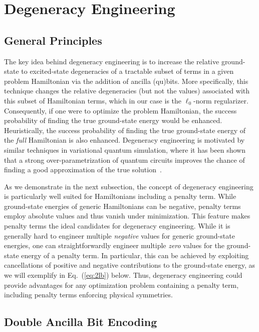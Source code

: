 \documentclass[aps,prd,twocolumn, superscriptaddress,preprintnumbers, nofootinbib,longbibliography,floatfix]{revtex4-2}
\DeclareRobustCommand{\Eq}[1]{Eq.~(\ref{#1})}
\begin{document}
\section{Degeneracy Engineering} \label{sec:DegEng}

\subsection{General Principles}

The key idea behind degeneracy engineering is to increase the relative ground-state to excited-state degeneracies of a tractable subset of terms in a given problem Hamiltonian via the addition of ancilla (qu)bits.
%
More specifically, this technique changes the relative degeneracies (but not the values) associated with this subset of Hamiltonian terms, which in our case is the $\ell_0$-norm regularizer.
%
Consequently, if one were to optimize the problem Hamiltonian, the success probability of finding the true ground-state energy would be enhanced.
%
Heuristically, the success probability of finding the true ground-state energy of the \emph{full} Hamiltonian is also enhanced.
%
Degeneracy engineering is motivated by similar techniques in variational quantum simulation, where it has been shown that a strong over-parametrization of quantum circuits improves the chance of finding a good approximation of the true solution~\cite{Fontana_2021,Kim_2021,anschuetz2022critical,anskiani}.


As we demonstrate in the next subsection, the concept of degeneracy engineering is particularly well suited for Hamiltonians including a penalty term.
%
While ground-state energies of generic Hamiltonians can be negative, penalty terms employ absolute values and thus vanish under minimization.
%
This feature makes penalty terms the ideal candidates for degeneracy engineering.
%
While it is generally hard to engineer multiple \textit{negative} values for generic ground-state energies, one can straightforwardly engineer multiple \textit{zero} values for the ground-state energy of a penalty term.
%
In particular, this can be achieved by exploiting cancellations of positive and negative contributions to the ground-state energy, as we will exemplify in \Eq{eq:2lb} below.
%
Thus, degeneracy engineering could provide advantages for any optimization problem containing a penalty term, including penalty terms enforcing physical symmetries. 



\subsection{Double Ancilla Bit Encoding}
\label{sec:DoubleEnc}
\end{document}
